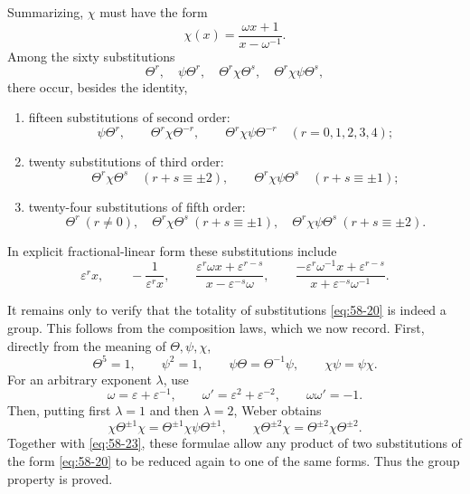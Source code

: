 \documentclass[11pt,a4paper]{article}
\newcommand{\eps}{\varepsilon}
\begin{document}
Summarizing, \(\chi\) must have the form
\begin{equation}\label{eq:58-19}
 \chi(x)=\frac{\omega x+1}{x-\omega^{-1}}.
\end{equation}
Among the sixty substitutions
\begin{equation}\label{eq:58-20}
 \Theta^r,
 \quad \psi\Theta^r,
 \quad \Theta^r\chi\Theta^s,
 \quad \Theta^r\chi\psi\Theta^s,
\end{equation}
there occur, besides the identity,
\begin{enumerate}[label=\arabic*.]
\item fifteen substitutions of second order:
\[
 \psi\Theta^r,
 \qquad \Theta^r\chi\Theta^{-r},
 \qquad \Theta^r\chi\psi\Theta^{-r}
 \quad (r=0,1,2,3,4);
\]
\item twenty substitutions of third order:
\[
 \Theta^r\chi\Theta^s\quad(r+s\equiv\pm2),
 \qquad
 \Theta^r\chi\psi\Theta^s\quad(r+s\equiv\pm1);
\]
\item twenty-four substitutions of fifth order:
\[
 \Theta^r\ (r\ne0),
 \quad \Theta^r\chi\Theta^s\ (r+s\equiv\pm1),
 \quad \Theta^r\chi\psi\Theta^s\ (r+s\equiv\pm2).
\]
\end{enumerate}
In explicit fractional-linear form these substitutions include
\begin{equation}\label{eq:58-22}
 \eps^r x,
 \qquad -\frac{1}{\eps^r x},
 \qquad
 \frac{\eps^r\omega x+\eps^{r-s}}{x-\eps^{-s}\omega},
 \qquad
 \frac{-\eps^r\omega^{-1}x+\eps^{r-s}}{x+\eps^{-s}\omega^{-1}}.
\end{equation}

It remains only to verify that the totality of substitutions \eqref{eq:58-20} is indeed a group.  This follows from the composition laws, which we now record.  First, directly from the meaning of \(\Theta,\psi,\chi\),
\begin{equation}\label{eq:58-23}
 \Theta^5=1,
 \qquad \psi^2=1,
 \qquad \psi\Theta=\Theta^{-1}\psi,
 \qquad \chi\psi=\psi\chi.
\end{equation}
For an arbitrary exponent \(\lambda\), use
\begin{equation}\label{eq:58-24}
 \omega=\eps+\eps^{-1},
 \qquad \omega'=\eps^2+\eps^{-2},
 \qquad \omega\omega'=-1.
\end{equation}
Then, putting first \(\lambda=1\) and then \(\lambda=2\), Weber obtains
\begin{equation}\label{eq:58-25}
 \chi\Theta^{\pm1}\chi=\Theta^{\pm1}\chi\psi\Theta^{\pm1},
 \qquad
 \chi\Theta^{\pm2}\chi=\Theta^{\pm2}\chi\Theta^{\pm2}.
\end{equation}
Together with \eqref{eq:58-23}, these formulae allow any product of two substitutions of the form \eqref{eq:58-20} to be reduced again to one of the same forms.  Thus the group property is proved.
\end{document}
